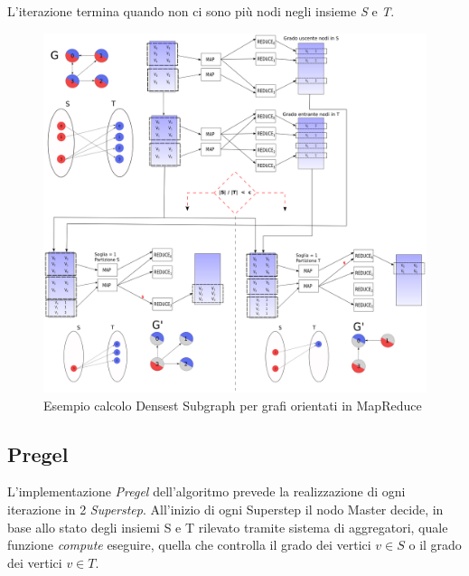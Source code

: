 \documentclass[LaM,binding=0.6cm]{sapthesis}
\begin{document}
L'iterazione termina quando non ci sono più nodi negli insieme \textit{S} e \textit{T}.


\begin{minipage}{\linewidth}

\end{minipage}
\begin{minipage}{\linewidth}

\end{minipage}


\begin{figure}
\centering	
 \includegraphics[width=1\textwidth]{MR-denesestD}
\caption{Esempio calcolo Densest Subgraph per grafi orientati in MapReduce}
\label{fig:MRDENSESESTD}
\end{figure}

\subsection{Pregel}

L'implementazione \textit{Pregel} dell'algoritmo prevede la realizzazione di ogni iterazione in 2 \textit{Superstep}.
 All'inizio di ogni Superstep il nodo Master decide, in base allo stato degli insiemi S e T rilevato tramite sistema di aggregatori, quale funzione \textit{compute} eseguire, quella che controlla il grado dei vertici \textit{$v \in S$} o il grado dei vertici \textit{$v \in T$}. 
\end{document}
